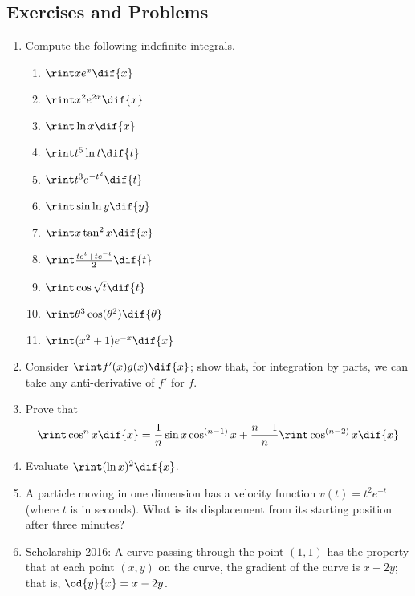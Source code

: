 \subsection{Exercises and Problems}
\begin{enumerate}
  \item Compute the following indefinite integrals.
    \begin{multicols}{2}
    \begin{enumerate}
      \item $ \rint x e^x \dif{x} $
      \item $ \rint x^2 e^{2x} \dif{x} $
      \item $ \rint \ln x \dif{x} $
      \item $ \rint t^5 \ln t \dif{t} $
      \item $ \rint t^3 e^{-t^2} \dif{t} $
      \item $ \rint \sin \ln y \dif{y} $
      \item $ \rint x \tan^2 x \dif{x} $
      \item $ \rint \frac{te^t + te^{-t}}{2} \dif{t} $
      \item $ \rint \cos \sqrt{t} \dif{t} $
      \item $ \rint \theta^3 \cos (\theta^2) \dif{\theta} $
      \item $ \rint (x^2 + 1)e^{-x} \dif{x} $
    \end{enumerate}
    \end{multicols}
  \item Consider $ \rint f'(x) g(x) \dif{x} $; show that, for integration by parts,
        we can take any anti-derivative of $ f' $ for $ f $.
  \item Prove that
        \begin{displaymath}
          \rint \cos^n x \dif{x} = \frac{1}{n} \sin x \cos^{(n - 1)} x + \frac{n-1}{n} \rint \cos^{(n - 2)} x \dif{x}
        \end{displaymath}
  \item Evaluate $ \rint (\ln x)^2 \dif{x} $.
  \item A particle moving in one dimension has a velocity function $ v(t) = t^2 e^{-t} $ (where $ t $ is in seconds). What is its displacement from its
        starting position after three minutes?
  \item Scholarship 2016: A curve passing through the point $ (1,1) $ has the property that at each point $ (x,y) $ on the curve,
        the gradient of the curve is $ x - 2y $; that is, $ \od{y}{x} = x - 2y $.
        \begin{enumerate}

\end{enumerate}
\end{enumerate}

